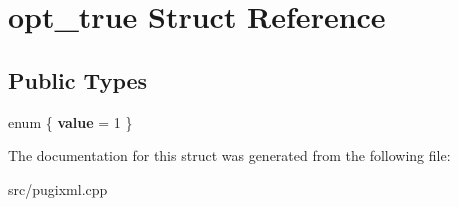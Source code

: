 \hypertarget{structopt__true}{}\section{opt\+\_\+true Struct Reference}
\label{structopt__true}
\subsection*{Public Types}
\begin{DoxyCompactItemize}
\item 
\mbox{\label{structopt__true_a93a7039f202aca3a935c98aa8e069ea5}} 
enum \{ {\bfseries value} = 1
 \}
\end{DoxyCompactItemize}


The documentation for this struct was generated from the following file\+:\begin{DoxyCompactItemize}
\item 
src/pugixml.\+cpp\end{DoxyCompactItemize}
